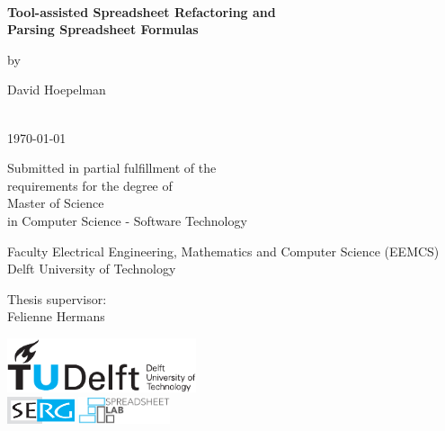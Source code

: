 
\thispagestyle{empty}
\onecolumn
{%
\sffamily
\centering

~\vspace{\fill}

{\huge \bfseries
Tool-assisted Spreadsheet Refactoring and \\ Parsing Spreadsheet Formulas\hspace{1.1mm}
}

\vspace{2.0cm}

by

\vspace{2.0cm}

{\LARGE
David Hoepelman
}

\vspace{2.5cm}

 \\
\today

\vspace{1.5cm}

Submitted in partial fulfillment of the \\
requirements for the degree of \\
Master of Science \\
in Computer Science - Software Technology \\

\vspace{0.5cm}

Faculty Electrical Engineering, Mathematics and Computer Science (EEMCS)\\
Delft University of Technology

\vspace{0.5cm}

Thesis supervisor: \\
Felienne Hermans

\vspace{1.5cm}

\includegraphics[height=16mm]{0-title/tudelft.pdf}
\\ %
\vspace{0.75cm}
\includegraphics[height=8mm]{0-title/serg}
\hspace{0.5cm}
\includegraphics[height=8mm]{0-title/spreadsheet-lab}

\vspace{\fill}

}